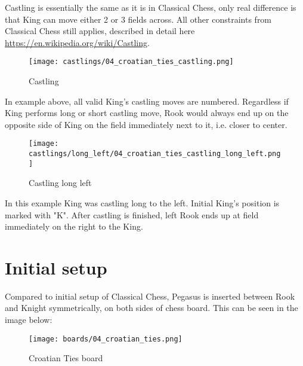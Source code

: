 Castling is essentially the same as it is in Classical Chess, only real difference is that
King can move either 2 or 3 fields across. All other constraints from Classical Chess still
applies, described in detail here \\
\href{https://en.wikipedia.org/wiki/Castling}{https://en.wikipedia.org/wiki/Castling}.

\noindent
\begin{figure}[!h]
\texttt{[image: castlings/04\_croatian\_ties\_castling.png]}
\caption{Castling}
\label{fig:04_croatian_ties_castling}
\end{figure}

In example above, all valid King's castling moves are numbered. Regardless if King performs
long or short castling move, Rook would always end up on the opposite side of King on the
field immediately next to it, i.e. closer to center.

\noindent
\begin{figure}[!h]
\texttt{[image: castlings/long\_left/04\_croatian\_ties\_castling\_long\_left.png]}
\caption{Castling long left}
\label{fig:04_croatian_ties_castling_long_left}
\end{figure}

In this example King was castling long to the left. Initial King's position is marked with "K".
After castling is finished, left Rook ends up at field immediately on the right to the King.

\clearpage %

\section*{Initial setup}

Compared to initial setup of Classical Chess, Pegasus is inserted between Rook and Knight
symmetrically, on both sides of chess board. This can be seen in the image below:

\noindent
\begin{figure}[h]
\texttt{[image: boards/04\_croatian\_ties.png]}
\caption{Croatian Ties board}
\label{fig:04_croatian_ties}
\end{figure}

\clearpage %
